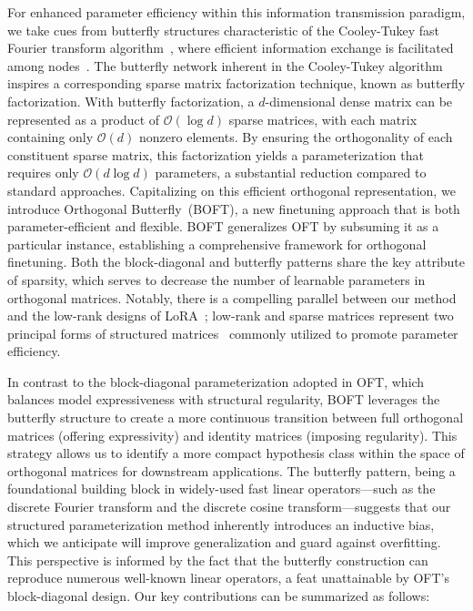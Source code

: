 For enhanced parameter efficiency within this information transmission paradigm, we take cues from butterfly structures characteristic of the Cooley-Tukey fast Fourier transform algorithm~\cite{cooley1965algorithm}, where efficient information exchange is facilitated among nodes~\cite{klasing1994broadcasting}. The butterfly network inherent in the Cooley-Tukey algorithm inspires a corresponding sparse matrix factorization technique, known as butterfly factorization. With butterfly factorization, a $d$-dimensional dense matrix can be represented as a product of $\mathcal{O}(\log d)$ sparse matrices, with each matrix containing only $\mathcal{O}(d)$ nonzero elements. By ensuring the orthogonality of each constituent sparse matrix, this factorization yields a parameterization that requires only $\mathcal{O}(d\log d)$ parameters, a substantial reduction compared to standard approaches. Capitalizing on this efficient orthogonal representation, we introduce Orthogonal Butterfly~(BOFT), a new finetuning approach that is both parameter-efficient and flexible. BOFT generalizes OFT by subsuming it as a particular instance, establishing a comprehensive framework for orthogonal finetuning. Both the block-diagonal and butterfly patterns share the key attribute of sparsity, which serves to decrease the number of learnable parameters in orthogonal matrices. Notably, there is a compelling parallel between our method and the low-rank designs of LoRA~\cite{hulora2022}; low-rank and sparse matrices represent two principal forms of structured matrices~\cite{candes2011robust} commonly utilized to promote parameter efficiency.

In contrast to the block-diagonal parameterization adopted in OFT, which balances model expressiveness with structural regularity, BOFT leverages the butterfly structure to create a more continuous transition between full orthogonal matrices (offering expressivity) and identity matrices (imposing regularity). This strategy allows us to identify a more compact hypothesis class within the space of orthogonal matrices for downstream applications. The butterfly pattern, being a foundational building block in widely-used fast linear operators—such as the discrete Fourier transform and the discrete cosine transform—suggests that our structured parameterization method inherently introduces an inductive bias, which we anticipate will improve generalization and guard against overfitting. This perspective is informed by the fact that the butterfly construction can reproduce numerous well-known linear operators, a feat unattainable by OFT’s block-diagonal design. Our key contributions can be summarized as follows:

